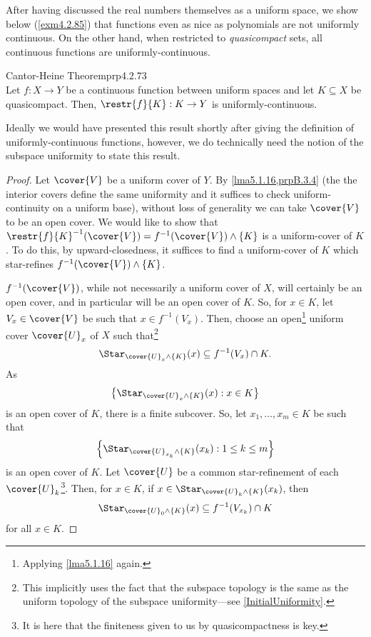 After having discussed the real numbers themselves as a uniform space, we show below (\cref{exm4.2.85}) that functions even as nice as polynomials are not uniformly continuous.  On the other hand, when restricted to \emph{quasicompact} sets, all continuous functions are uniformly-continuous.
\begin{prp}{Cantor-Heine Theorem}{prp4.2.73}
\\
Let $f\colon X\rightarrow Y$ be a continuous function between uniform spaces and let $K\subseteq X$ be quasicompact.  Then, $\restr{f}{K}:K\rightarrow Y$ is uniformly-continuous.
\begin{rmk}
Ideally we would have presented this result shortly after giving the definition of uniformly-continuous functions, however, we do technically need the notion of the subspace uniformity to state this result.
\end{rmk}
\begin{proof}
Let $\cover{V}$ be a uniform cover of $Y$.  By \cref{lma5.1.16,prpB.3.4} (the the interior covers define the same uniformity and it suffices to check uniform-continuity on a uniform base), without loss of generality we can take $\cover{V}$ to be an open cover.  We would like to show that $\restr{f}{K}^{-1}(\cover{V})=f^{-1}(\cover{V})\wedge \{ K\}$ is a uniform-cover of $K$.  To do this, by upward-closedness, it suffices to find a uniform-cover of $K$ which star-refines $f^{-1}(\cover{V})\wedge \{ K\}$.

$f^{-1}(\cover{V})$, while not necessarily a uniform cover of $X$, will certainly be an open cover, and in particular will be an open cover of $K$.  So, for $x\in K$, let $V_x\in \cover{V}$ be such that $x\in f^{-1}(V_x)$.  Then, choose an open\footnote{Applying \cref{lma5.1.16} again.} uniform cover $\cover{U}_x$ of $X$ such that\footnote{This implicitly uses the fact that the subspace topology is the same as the uniform topology of the subspace uniformity---see \cref{InitialUniformity}.}
\begin{equation}
\Star _{\cover{U}_x\wedge \{ K\}}(x)\subseteq f^{-1}(V_x)\cap K.
\end{equation}
As
\begin{equation}
\left\{ \Star _{\cover{U}_x\wedge \{ K\}}(x):x\in K\right\}
\end{equation}
is an open cover of $K$, there is a finite subcover.  So, let $x_1,\ldots ,x_m\in K$ be such that
\begin{equation}
\left\{ \Star _{\cover{U}_{x_k}\wedge \{ K\}}(x_k):1\leq k\leq m\right\}
\end{equation}
is an open cover of $K$.  Let $\cover{U}$ be a common star-refinement of each $\cover{U}_k$\footnote{It is here that the finiteness given to us by quasicompactness is key.}.  Then, for $x\in K$, if $x\in \Star _{\cover{U}_k\wedge \{ K\}}(x_k)$, then
\begin{equation}\label{eqn4.1.98}
\Star _{\cover{U}_0\wedge \{ K\}}(x)\subseteq f^{-1}(V_{x_k})\cap K
\end{equation}
for all $x\in K$.


\end{proof}
\end{prp}
